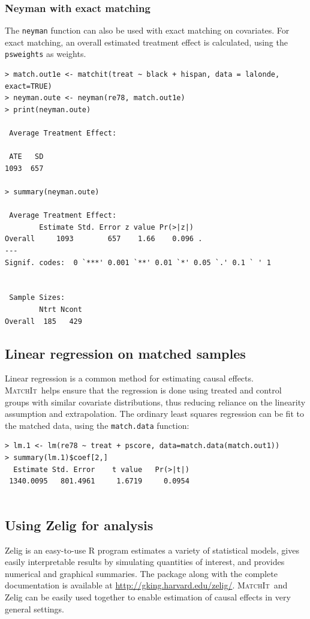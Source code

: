 \documentclass[oneside,letterpaper,titlepage]{article}
\newcommand{\MatchIt}{\textsc{MatchIt}}
\begin{document}
\subsubsection{Neyman with exact matching}
The {\tt neyman} function can also be used with exact matching on
covariates.  For exact matching, an overall estimated treatment effect
is calculated, using the {\tt psweights} as weights.

\begin{verbatim}
> match.out1e <- matchit(treat ~ black + hispan, data = lalonde, exact=TRUE)
> neyman.oute <- neyman(re78, match.out1e)
> print(neyman.oute)
 
 Average Treatment Effect:
  
 ATE   SD
1093  657
 
> summary(neyman.oute)
 
 Average Treatment Effect:
        Estimate Std. Error z value Pr(>|z|)
Overall     1093        657    1.66    0.096 .
---
Signif. codes:  0 `***' 0.001 `**' 0.01 `*' 0.05 `.' 0.1 ` ' 1
 
 
 Sample Sizes:
        Ntrt Ncont
Overall  185   429
\end{verbatim}

\subsection{Linear regression on matched samples}
Linear regression is a common method for estimating causal effects.
\MatchIt\ helps ensure that the regression is done using treated and
control groups with similar covariate distributions, thus reducing
reliance on the linearity assumption and extrapolation.  The ordinary
least squares regression can be fit to the matched data, using the
{\tt match.data} function:

\begin{verbatim}
> lm.1 <- lm(re78 ~ treat + pscore, data=match.data(match.out1))
> summary(lm.1)$coef[2,]
  Estimate Std. Error    t value   Pr(>|t|)
 1340.0095   801.4961     1.6719     0.0954


\end{verbatim} 

\subsection{Using Zelig for analysis}
Zelig is an easy-to-use R program estimates a variety of statistical
models, gives easily interpretable results by simulating quantities of
interest, and provides numerical and graphical summaries.  The package
along with the complete documentation is available at
\href{http://gking.harvard.edu/zelig/}{http://gking.harvard.edu/zelig/}.
\MatchIt\ and Zelig can be easily used together to enable estimation
of causal effects in very general settings.
\end{document}
